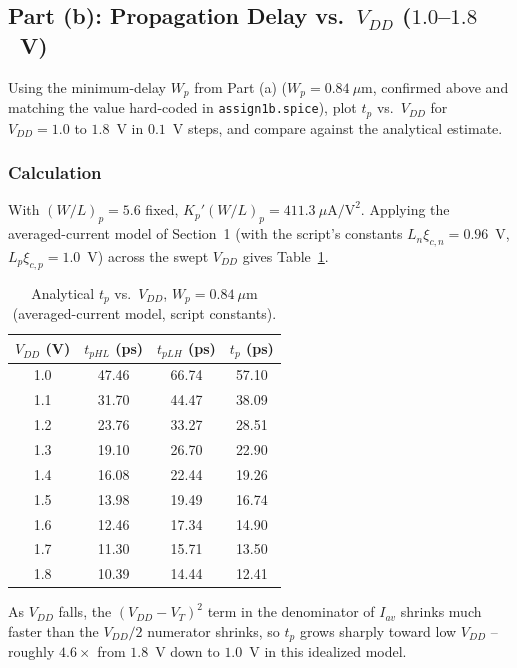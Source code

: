 \subsection{Part (b): Propagation Delay vs.\ $V_{DD}$ ($1.0$--$1.8$~V)}

Using the minimum-delay $W_p$ from Part (a) ($W_p=0.84\ \mu\text{m}$, confirmed
above and matching the value hard-coded in \texttt{assign1b.spice}), plot
$t_p$ vs.\ $V_{DD}$ for $V_{DD}=1.0$ to $1.8$~V in $0.1$~V steps, and
compare against the analytical estimate.

\subsubsection{Calculation}

With $(W/L)_p=5.6$ fixed, $K_p'(W/L)_p = 411.3\ \mu\text{A/V}^2$. Applying the
averaged-current model of Section~1 (with the script's constants
$L_n\xi_{c,n}=0.96$~V, $L_p\xi_{c,p}=1.0$~V) across the swept $V_{DD}$ gives
Table~\ref{tab:1b-analytical}.

\begin{table}[h]
  \centering
  \begin{tabular}{|c|c|c|c|}
    \hline
    $V_{DD}$ (V) & $t_{pHL}$ (ps) & $t_{pLH}$ (ps) & $t_p$ (ps) \\
    \hline
    1.0 & 47.46 & 66.74 & 57.10 \\
    1.1 & 31.70 & 44.47 & 38.09 \\
    1.2 & 23.76 & 33.27 & 28.51 \\
    1.3 & 19.10 & 26.70 & 22.90 \\
    1.4 & 16.08 & 22.44 & 19.26 \\
    1.5 & 13.98 & 19.49 & 16.74 \\
    1.6 & 12.46 & 17.34 & 14.90 \\
    1.7 & 11.30 & 15.71 & 13.50 \\
    1.8 & 10.39 & 14.44 & 12.41 \\
    \hline
  \end{tabular}
  \caption{Analytical $t_p$ vs.\ $V_{DD}$, $W_p=0.84\ \mu\text{m}$
  (averaged-current model, script constants).}
  \label{tab:1b-analytical}
\end{table}

As $V_{DD}$ falls, the $(V_{DD}-V_T)^2$ term in the denominator of $I_{av}$
shrinks much faster than the $V_{DD}/2$ numerator shrinks, so $t_p$ grows
sharply toward low $V_{DD}$ -- roughly $4.6\times$ from $1.8$~V down to
$1.0$~V in this idealized model.

